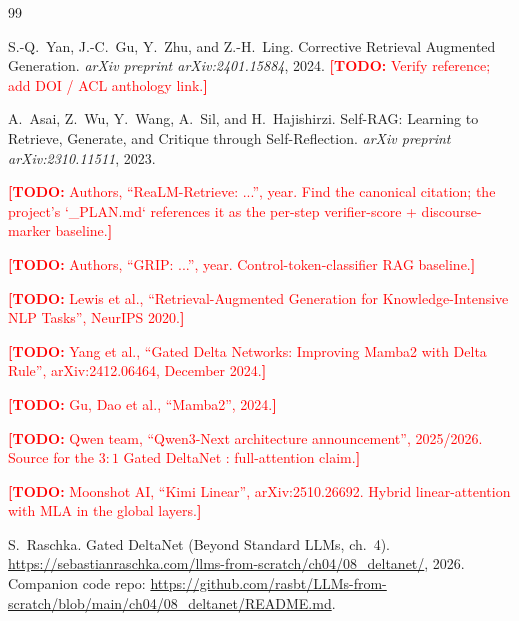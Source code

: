 \documentclass[11pt,letterpaper]{article}
\newcommand{\TODO}[1]{\textcolor{red}{\textbf{[TODO:} #1\textbf{]}}}
\begin{document}


\begin{thebibliography}{99}

S.-Q.~Yan, J.-C.~Gu, Y.~Zhu, and Z.-H.~Ling.
\newblock Corrective Retrieval Augmented Generation.
\newblock \emph{arXiv preprint arXiv:2401.15884}, 2024.
\TODO{Verify reference; add DOI / ACL anthology link.}

A.~Asai, Z.~Wu, Y.~Wang, A.~Sil, and H.~Hajishirzi.
\newblock Self-RAG: Learning to Retrieve, Generate, and Critique through Self-Reflection.
\newblock \emph{arXiv preprint arXiv:2310.11511}, 2023.

\TODO{Authors, ``ReaLM-Retrieve: ...'', year. Find the canonical
citation; the project's `_PLAN.md` references it as the per-step
verifier-score + discourse-marker baseline.}

\TODO{Authors, ``GRIP: ...'', year. Control-token-classifier RAG
baseline.}

\TODO{Lewis et al., ``Retrieval-Augmented Generation for
Knowledge-Intensive NLP Tasks'', NeurIPS 2020.}

\TODO{Yang et al., ``Gated Delta Networks: Improving Mamba2 with Delta
Rule'', arXiv:2412.06464, December 2024.}

\TODO{Gu, Dao et al., ``Mamba2'', 2024.}

\TODO{Qwen team, ``Qwen3-Next architecture announcement'', 2025/2026.
Source for the $3{:}1$ Gated DeltaNet : full-attention claim.}

\TODO{Moonshot AI, ``Kimi Linear'', arXiv:2510.26692. Hybrid
linear-attention with MLA in the global layers.}

S.~Raschka.
\newblock Gated DeltaNet (Beyond Standard LLMs, ch.~4).
\newblock \url{https://sebastianraschka.com/llms-from-scratch/ch04/08_deltanet/},
2026. Companion code repo: \url{https://github.com/rasbt/LLMs-from-scratch/blob/main/ch04/08_deltanet/README.md}.


\end{thebibliography}
\end{document}
